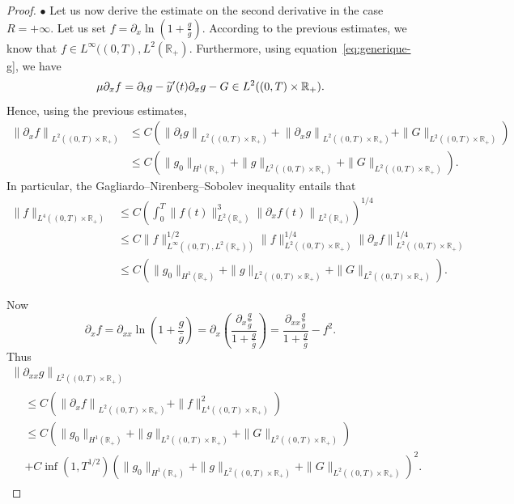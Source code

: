 \documentclass[10pt]{amsart}
\theoremstyle{definition}\newtheorem{defi}[theo]{Definition}\newtheorem{rema}[theo]{Remark}\newtheorem{exam}[theo]{Example}\newtheorem{exem}[theo]{Example}\newtheorem{nota}[theo]{Notation}
\newcommand{\R}{\mathbb{R}}
\newcommand{\p}{\partial}
\let\oldtilde\tilde
\renewcommand*{\tilde}[1]{\mathchoice{\widetilde{#1}}{\widetilde{#1}}{\oldtilde{#1}}{\oldtilde{#1}}}
\begin{document}
\begin{proof}
$\bullet$ Let us now derive the estimate on the second derivative in the case $R=+\infty$. Let us set $f=\p_x \ln (1+ \frac{g}{\bar g})$. According to the previous estimates, we know that $f\in L^\infty((0,T), L^2(\R_+)$. Furthermore, using equation~\eqref{eq:generique-g}, we have
\[
\mu \p_x f = \p_t g - \tilde y'(t) \p_x g - G\in L^2((0,T)\times \R_+).
\]
Hence, using the previous estimates,
\begin{align*}
\left\|\p_x f\right\|_{L^2\left((0,T)\times \R_+\right)}&\leq C \left(\left\|\p_t g\right\|_{L^2\left((0,T)\times \R_+\right)} + \left\|\p_x g\right\|_{L^2\left((0,T)\times \R_+\right)} + \|G\|_{L^2\left((0,T)\times \R_+\right)}\right) \\
&\leq C \left(\|g_0\|_{H^1(\R_+)} + \|g\|_{L^2\left((0,T)\times \R_+\right)} + \|G\|_{L^2\left((0,T)\times \R_+\right)}\right).
\end{align*}
In particular, the Gagliardo--Nirenberg--Sobolev inequality entails that
\begin{align*}
\| f\|_{L^4\left((0,T)\times\R_+\right)}&\leq C \left(\int_0^T \|f(t)\|_{L^2(\R_+)}^3 \left\|\p_x f(t)\right\|_{L^2(\R_+)}\right)^{1/4}\\
&\leq C\|f\|_{L^\infty\left((0,T), L^2(\R_+)\right)}^{1/2} \| f\|_{L^2\left((0,T)\times \R_+\right)}^{1/4}\left\| \p_x f\right\|_{L^2\left((0,T)\times \R_+\right)}^{1/4}\\
&\leq C \left(\|g_0\|_{H^1(\R_+)} + \|g\|_{L^2\left((0,T)\times \R_+\right)} + \|G\|_{L^2\left((0,T)\times \R_+\right)}\right).
\end{align*}


Now
\[
\p_x f=\p_{xx}\ln\left(1 + \frac{g}{\bar g}\right) = \p_x \left(\frac{\p_x \frac{g}{\bar g}}{1 + \frac{g}{\bar g}}\right)= \frac{\p_{xx} \frac{g}{\bar g}}{1 + \frac{g}{\bar g}} - f^2.
\]
Thus
\begin{multline*}
\left\|\p_{xx} g\right\|_{L^2\left((0,T)\times \R_+\right)}\\
\begin{aligned}
&\leq C \left(\left\|\p_x f\right\|_{L^2\left((0,T)\times \R_+\right)} + \|f\|_{L^4\left((0,T)\times \R_+\right)}^2\right)\\
&\leq C \left(\|g_0\|_{H^1(\R_+)} + \|g\|_{L^2\left((0,T)\times \R_+\right)} + \|G\|_{L^2\left((0,T)\times \R_+\right)}\right)\\
&+ C \inf\left(1, T^{1/2}\right)\left(\|g_0\|_{H^1(\R_+)} + \|g\|_{L^2\left((0,T)\times \R_+\right)} + \|G\|_{L^2\left((0,T)\times \R_+\right)}\right)^2.
\end{aligned}
\end{multline*}
\end{proof}
\end{document}
